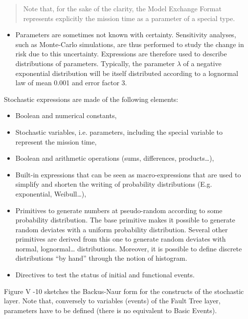 \documentclass[11pt]{article}
\begin{document}
\begin{quote}
Note that, for the sake of the clarity, the Model Exchange Format
represents explicitly the mission time as a parameter of a special
type.
\end{quote}

\begin{itemize}
\item Parameters are sometimes not known with certainty. Sensitivity
analyses, such as Monte-Carlo simulations, are thus performed to
study the change in risk due to this uncertainty. Expressions are
therefore used to describe distributions of parameters. Typically,
the parameter \(\lambda\) of a negative exponential distribution will be itself
distributed according to a lognormal law of mean 0.001 and error
factor 3.
\end{itemize}

Stochastic expressions are made of the following elements:

\begin{itemize}
\item Boolean and numerical constants,

\item Stochastic variables, i.e. parameters, including the special variable
to represent the mission time,

\item Boolean and arithmetic operations (sums, differences, products\ldots{}),

\item Built-in expressions that can be seen as macro-expressions that are
used to simplify and shorten the writing of probability distributions
(E.g. exponential, Weibull\ldots{}),

\item Primitives to generate numbers at pseudo-random according to some
probability distribution. The base primitive makes it possible to
generate random deviates with a uniform probability distribution.
Several other primitives are derived from this one to generate random
deviates with normal, lognormal\ldots{} distributions. Moreover, it is
possible to define discrete distributions ``by hand'' through the
notion of histogram.

\item Directives to test the status of initial and functional events.
\end{itemize}

Figure V -10 sketches the Backus-Naur form for the constructs of the
stochastic layer. Note that, conversely to variables (events) of the
Fault Tree layer, parameters have to be defined (there is no equivalent
to Basic Events).
\end{document}
